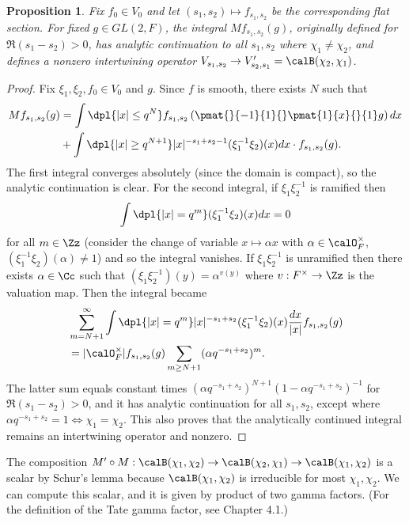\documentclass{article}
\newtheorem{proposition}{Proposition}[section]
\begin{document}
\begin{proposition}
Fix $f_{0}\in V_{0}$ and let $(s_{1}, s_{2})\mapsto f_{s_{1}, s_{2}}$ be the corresponding flat section. 
For fixed $g\in GL(2, F)$, the integral $Mf_{s_{1}, s_{2}}(g)$, originally defined for $\Re(s_{1} - s_{2})>0$, has analytic continuation to all $s_{1}, s_{2}$ where $\chi_1 \neq\chi_2$, and defines a nonzero intertwining operator $V_{s_{1}, s_{2}}\to V_{s_{2}, s_{1}}' = \calB(\chi_2, \chi_1)$. 
\end{proposition}
\begin{proof}
Fix $\xi_1, \xi_2, f_{0}\in V_{0}$ and $g$. Since $f$ is smooth, there exists $N$ such that 
\begin{align*}
Mf_{s_{1}, s_{2}}(g) &= \int\dpl{|x|\leq q^{N}} f_{s_{1}, s_{2}}\left( \pmat{}{-1}{1}{} \pmat{1}{x}{}{1} g\right) dx \\
&+ \int\dpl{|x|\geq q^{N+1}} |x|^{-s_{1} + s_{2} -1} (\xi_{1}^{-1}\xi_{2})(x) dx \cdot f_{s_{1},s_{2}}(g). 
\end{align*}
The first integral converges absolutely (since the domain is compact), so the analytic continuation is clear. 
For the second integral, if $\xi_{1}\xi_{2}^{-1}$ is ramified then 
$$
\int\dpl{|x| = q^{m}} (\xi_{1}^{-1}\xi_{2})(x)dx = 0
$$ 
for all $m\in \Zz$ (consider the change of variable $x\mapsto \alpha x$ with $\alpha\in \calO_{F}^{\times}$, $(\xi_{1}^{-1}\xi_{2})(\alpha)\neq 1$) and so the integral vanishes. 
If $\xi_{1}\xi_{2}^{-1}$ is unramified then there exists $\alpha\in \Cc$ such that $(\xi_{1}\xi_{2}^{-1})(y) = \alpha^{v(y)}$ where $v:F^{\times} \to \Zz$ is the valuation map. 
Then the integral became
\begin{align*}
&\sum_{m = N+1}^{\infty}\int\dpl{|x|= q^{m}} |x|^{-s_{1} + s_{2}} (\xi_{1}^{-1}\xi_{2})(x) \frac{dx}{|x|} f_{s_{1}, s_{2}}(g) \\
&= |\calO_{F}^{\times}| f_{s_{1}, s_{2}}(g) \sum_{m \geq N+1} (\alpha q^{-s_{1} + s_{2}})^{m}. 
\end{align*}
The latter sum equals constant times $(\alpha q^{-s_{1} + s_{2}})^{N+1} (1-\alpha q^{-s_{1}+s_{2}})^{-1}$ for $\Re(s_{1} - s_{2}) >0$, and it has analytic continuation for all $s_{1}, s_{2}$, except where $\alpha q^{-s_{1} +s_{2}} = 1 \Leftrightarrow \chi_{1} = \chi_{2}$. 
This also proves that the analytically continued integral remains an intertwining operator and nonzero. 
\end{proof}

The composition $M'\circ M : \calB(\chi_1, \chi_2)\to \calB(\chi_2, \chi_1)\to \calB(\chi_1, \chi_2)$ is a scalar by Schur's lemma because $\calB(\chi_1, \chi_2)$ is irreducible for most $\chi_1, \chi_2$. 
We can compute this scalar, and it is given by product of two gamma factors. (For the definition of the Tate gamma factor, see Chapter 4.1.)
\end{document}
